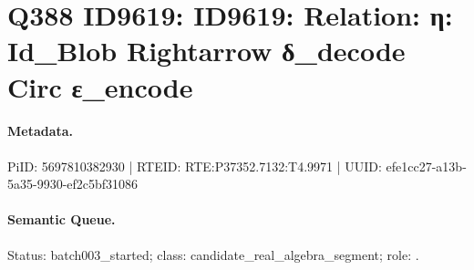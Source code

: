 \section*{Q388 ID9619: ID9619: Relation: η: Id\_Blob Rightarrow δ\_decode Circ ε\_encode}
\paragraph{Metadata.}
PiID: 5697810382930 | RTEID: RTE:P37352.7132:T4.9971 | UUID: efe1cc27-a13b-5a35-9930-ef2c5bf31086

\paragraph{Semantic Queue.}
Status: batch003\_started; class: candidate\_real\_algebra\_segment; role: .

